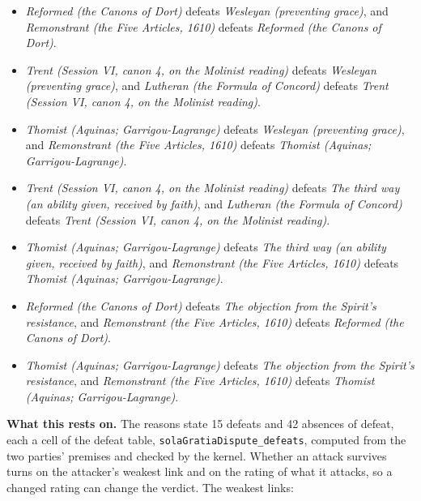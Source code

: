 \documentclass[11pt]{article}
\begin{document}
\begin{itemize}
\begin{itemize}
\item \emph{Reformed (the Canons of Dort)} defeats \emph{Wesleyan (preventing grace)}, and \emph{Remonstrant (the Five Articles, 1610)} defeats \emph{Reformed (the Canons of Dort)}.
\item \emph{Trent (Session VI, canon 4, on the Molinist reading)} defeats \emph{Wesleyan (preventing grace)}, and \emph{Lutheran (the Formula of Concord)} defeats \emph{Trent (Session VI, canon 4, on the Molinist reading)}.
\item \emph{Thomist (Aquinas; Garrigou-Lagrange)} defeats \emph{Wesleyan (preventing grace)}, and \emph{Remonstrant (the Five Articles, 1610)} defeats \emph{Thomist (Aquinas; Garrigou-Lagrange)}.
\item \emph{Trent (Session VI, canon 4, on the Molinist reading)} defeats \emph{The third way (an ability given, received by faith)}, and \emph{Lutheran (the Formula of Concord)} defeats \emph{Trent (Session VI, canon 4, on the Molinist reading)}.
\item \emph{Thomist (Aquinas; Garrigou-Lagrange)} defeats \emph{The third way (an ability given, received by faith)}, and \emph{Remonstrant (the Five Articles, 1610)} defeats \emph{Thomist (Aquinas; Garrigou-Lagrange)}.
\item \emph{Reformed (the Canons of Dort)} defeats \emph{The objection from the Spirit’s resistance}, and \emph{Remonstrant (the Five Articles, 1610)} defeats \emph{Reformed (the Canons of Dort)}.
\item \emph{Thomist (Aquinas; Garrigou-Lagrange)} defeats \emph{The objection from the Spirit’s resistance}, and \emph{Remonstrant (the Five Articles, 1610)} defeats \emph{Thomist (Aquinas; Garrigou-Lagrange)}.
\end{itemize}
\end{itemize}
\par\noindent\textbf{What this rests on.} The reasons state 15 defeats and 42 absences of defeat, each a cell of the defeat table, \texttt{sola\allowbreak{}Gratia\allowbreak{}Dispute\_\allowbreak{}defeats}, computed from the two parties' premises and checked by the kernel. Whether an attack survives turns on the attacker's weakest link and on the rating of what it attacks, so a changed rating can change the verdict. The weakest links:
\end{document}
